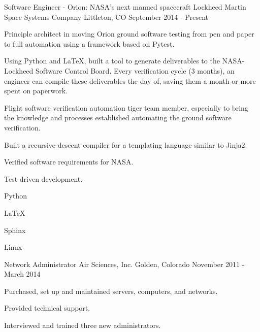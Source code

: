 

\begin{cventries}

  \cventry
    {Software Engineer - Orion: NASA's next manned spacecraft} %
    {Lockheed Martin Space Systems Company} %
    {Littleton, CO} %
    {September 2014 - Present} %
    {
      \begin{cvitems} %
        \item {Principle architect in moving Orion ground software testing from pen and paper to full automation using a framework based on Pytest.}
        \item {Using Python and LaTeX, built a tool to generate deliverables to the NASA-Lockheed Software Control Board.  Every verification cycle (3 months), an engineer can compile these deliverables the day of, saving them a month or more spent on paperwork.}
        \item {Flight software verification automation tiger team member, especially to bring the knowledge and processes established automating the ground software verification.}
        \item {Built a recursive-descent compiler for a templating language similar to Jinja2.}
        \item {Verified software requirements for NASA.}
        \item {Test driven development.}
      \end{cvitems}
    }
    \begin{cventryskills}
      \item Python
      \item LaTeX
      \item Sphinx
      \item Linux
    \end{cventryskills}

  \cventry
    {Network Administrator} %
    {Air Sciences, Inc.} %
    {Golden, Colorado} %
    {November 2011 - March 2014} %
    {
      \begin{cvitems} %
        \item {Purchased, set up and maintained servers, computers, and networks.}
        \item {Provided technical support.}
        \item {Interviewed and trained three new administrators.}
      \end{cvitems}
    }


\end{cventries}
